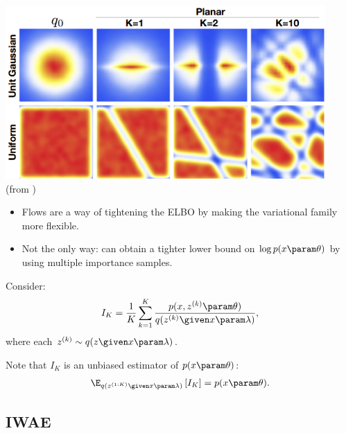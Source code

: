\begin{frame}
\center 
\includegraphics[scale=0.4]{pics/normflows.png} \\
\vspace{5mm}
(from \cite{Rezende2015})
\end{frame} 
\begin{frame}
\begin{itemize}
    \item Flows are a way of tightening the ELBO by making the variational family more flexible. 
    \item Not the only way: can obtain a tighter lower bound on $\log p(x \param \theta)$ by using multiple importance samples.
\end{itemize}

    \air
    \air

    Consider:
    \begin{align*}
        I_K = \frac{1}{K} \sum_{k=1}^K \frac{p(x, z^{(k)} \param \theta)}{q(z^{(k)} \given x \param \lambda)},
    \end{align*}
    where each $z^{(k)} \sim q(z \given x \param \lambda)$.
    
    \air
    \air
    Note that $I_K$ is an unbiased estimator of $p(x \param \theta)$:
    \begin{align*}
        \E_{q(z^{(1:K)} \given x \param \lambda)} \left[I_K \right] = p(x \param \theta).
    \end{align*}

\air
% 
\end{frame}

\subsection{IWAE}

